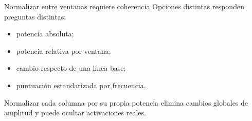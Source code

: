 \documentclass[
  ignorenonframetext,
  aspectratio=169,
  spanish,
]{beamer}
\providecommand{\tightlist}{%
  \setlength{\itemsep}{0pt}\setlength{\parskip}{0pt}}
\begin{document}
\begin{frame}{Normalizar entre ventanas requiere coherencia}
  \protect{}\label{normalizar-entre-ventanas-requiere-coherencia}
  Opciones distintas responden preguntas distintas:

  \begin{itemize}
    \tightlist
    \item
          potencia absoluta;
    \item
          potencia relativa por ventana;
    \item
          cambio respecto de una línea base;
    \item
          puntuación estandarizada por frecuencia.
  \end{itemize}

  \begin{tcolorbox}[enhanced jigsaw, arc=.35mm, bottomrule=.15mm, bottomtitle=1mm, breakable, colback=white, colbacktitle=quarto-callout-warning-color!10!white, colframe=quarto-callout-warning-color-frame, coltitle=black, left=2mm, leftrule=.75mm, opacityback=0, opacitybacktitle=0.6, rightrule=.15mm, title=\textcolor{quarto-callout-warning-color}{\faExclamationTriangle}\hspace{0.5em}{Advertencia}, titlerule=0mm, toprule=.15mm, toptitle=1mm]

    Normalizar cada columna por su propia potencia elimina cambios globales
    de amplitud y puede ocultar activaciones reales.

  \end{tcolorbox}
\end{frame}
\end{document}
